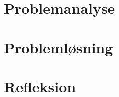 \documentclass[a4paper,11pt,fleqn,twoside,openright]{memoir}
\begin{document}
\sloppy
\frontmatter



\cleardoublepage



\cleardoublepage

%

\thispagestyle{empty}
\tableofcontents*
\label{table_of_contents}



\mainmatter






\part{Problemanalyse}






%

\makeatletter\@openrightfalse
\let\cleardoublepage\clearpage
\part{Problemløsning}










\makeatletter\@openrightfalse
\let\cleardoublepage\clearpage
\part{Refleksion}



\end{document}

